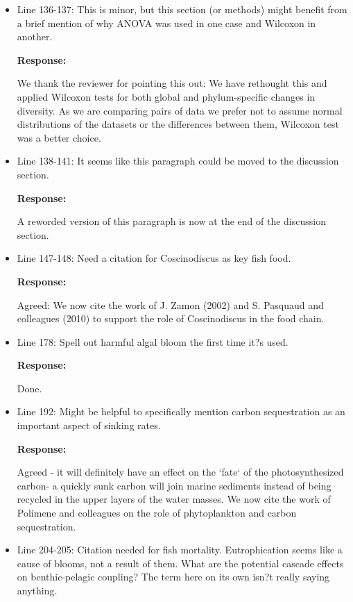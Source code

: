 \documentclass[11pt]{article}
\begin{document}
\begin{linenumbers}
\begin{itemize}
\item{Line 136-137: This is minor, but this section (or methods) might benefit from a brief mention of why ANOVA was used in one case and Wilcoxon in another.}

\textbf{Response:} 

We thank the reviewer for pointing this out: We have rethought this and applied Wilcoxon tests for both global and phylum-specific changes in diversity. As we are comparing pairs of data we prefer not to assume normal distributions of the datasets or the differences between them, Wilcoxon test was a better choice.


\item{Line 138-141: It seems like this paragraph could be moved to the discussion section.}

\textbf{Response:}

 A reworded version of this paragraph is now at the end of the discussion section.


\item{Line 147-148: Need a citation for Coscinodiscus as key fish food.}

\textbf{Response:}

 Agreed: We now cite the work of J. Zamon (2002) and S. Pasquaud and colleagues (2010) to support the role of Coscinodiscus in the food chain.


\item{Line 178: Spell out harmful algal bloom the first time it?s used.}

\textbf{Response:}

  Done.
  
\item{Line 192: Might be helpful to specifically mention carbon sequestration as an important aspect of sinking rates.}

\textbf{Response:}

 Agreed - it will definitely have an effect on the `fate` of the photosynthesized carbon- a quickly sunk carbon will join marine sediments instead of being recycled in the upper layers of the water masses. We now cite the work of Polimene and colleagues on the role of phytoplankton and carbon sequestration.

\item{Line 204-205: Citation needed for fish mortality. Eutrophication seems like a cause of blooms, not a result of them. What are the potential cascade effects on benthic-pelagic coupling? The term here on its own isn?t really saying anything.}


\end{itemize}
\end{linenumbers}
\end{document}
